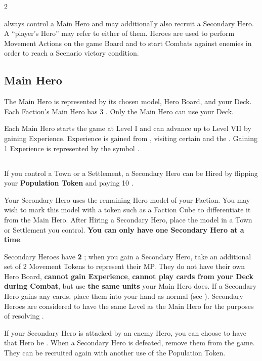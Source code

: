 
\begin{multicols*}{2}

 always control a Main Hero and may additionally also recruit a Secondary Hero.
A ``player's Hero'' may refer to either of them.
Heroes are used to perform Movement Actions on the game Board and to start Combats against enemies in order to reach a Scenario victory condition.

\subsection*{Main Hero}
The Main Hero is represented by its chosen model, Hero Board, and your Deck.
Each Faction's Main Hero has 3 .
Only the Main Hero can use your Deck.\par
Each Main Hero starts the game at Level I and can advance up to Level VII by gaining Experience.
Experience is gained from , visiting certain  and the .
Gaining 1 Experience is represented by the symbol .

\subsection*{}
If you control a Town or a Settlement, a Secondary Hero can be Hired by flipping your \textbf{Population Token} and paying 10 .\par
{}\par
Your Secondary Hero uses the remaining Hero model of your Faction.
You may wish to mark this model with a token such as a Faction Cube to differentiate it from the Main Hero.
After Hiring a Secondary Hero, place the model in a Town or Settlement you control.
\textbf{You can only have one Secondary Hero at a time}.\par
\columnbreak
Secondary Heroes have \textbf{2 }; when you gain a Secondary Hero, take an additional set of 2 Movement Tokens to represent their MP.
They do not have their own Hero Board, \textbf{cannot gain Experience}, \textbf{cannot play cards from your Deck during Combat}, but use \textbf{the same units} your Main Hero does.
If a Secondary Hero gains any cards, place them into your hand as normal (see ).
Secondary Heroes are considered to have the same Level as the Main Hero for the purposes of resolving .\par
If your Secondary Hero is attacked by an enemy Hero, you can choose to have that Hero be .
When a Secondary Hero is defeated, remove them from the game.
They can be recruited again with another use of the Population Token.\par


\end{multicols*}
